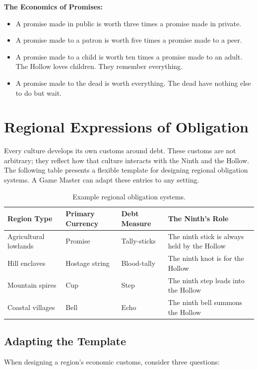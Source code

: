 \documentclass[12pt,oneside]{book}
\begin{document}
\textbf{The Economics of Promises:}
\begin{itemize}
\item A promise made in public is worth three times a promise made in private.
\item A promise made to a patron is worth five times a promise made to a peer.
\item A promise made to a child is worth ten times a promise made to an adult. The Hollow loves children. They remember everything.
\item A promise made to the dead is worth everything. The dead have nothing else to do but wait.
\end{itemize}

\section{Regional Expressions of Obligation}

Every culture develops its own customs around debt. These customs are not arbitrary; they reflect how that culture interacts with the Ninth and the Hollow. The following table presents a flexible template for designing regional obligation systems. A Game Master can adapt these entries to any setting.

\begin{table}[h]
\centering
\begin{tabular}{|p{3cm}|p{3cm}|p{3cm}|p{3cm}|}
\hline
\textbf{Region Type} & \textbf{Primary Currency} & \textbf{Debt Measure} & \textbf{The Ninth's Role} \\
\hline
Agricultural lowlands & Promise & Tally-sticks & The ninth stick is always held by the Hollow \\
Hill enclaves & Hostage string & Blood-tally & The ninth knot is for the Hollow \\
Mountain spires & Cup & Step & The ninth step leads into the Hollow \\
Coastal villages & Bell & Echo & The ninth bell summons the Hollow \\
\hline
\end{tabular}
\caption{Example regional obligation systems.}
\end{table}

\subsection{Adapting the Template}

When designing a region's economic customs, consider three questions:
\end{document}
